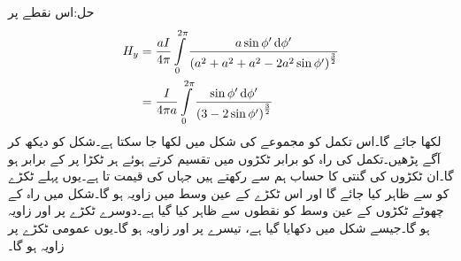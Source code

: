 حل:اس نقطے پر 
\begin{align*}
H_y&=\frac{aI}{4\pi}\int\limits_0^{2\pi} \frac{a\sin \phi' \dif \phi'}{\left(a^2+a^2+a^2-2 a^2\sin \phi'\right)^{\frac{3}{2}}}\\
&=\frac{I}{4\pi a}\int\limits_0^{2\pi} \frac{\sin \phi' \dif \phi'}{\left(3-2\sin \phi'\right)^{\frac{3}{2}}}
\end{align*}
لکھا جائے گا۔اس تکمل کو مجموعے کی شکل میں لکھا جا سکتا ہے۔شکل  کو دیکھ کر آگے پڑھیں۔تکمل کی راہ کو  برابر ٹکڑوں میں تقسیم کرتے  ہوئے ہر ٹکڑا پر  کے برابر ہو گا۔ان ٹکڑوں کی گنتی کا حساب ہم  سے رکھتے ہیں جہاں  کی قیمت  تا  ہے۔یوں پہلے ٹکڑے کو  سے ظاہر کیا جائے گا اور اس ٹکڑے کے عین وسط میں زاویہ  ہو گا۔شکل میں راہ کے چھوٹے ٹکڑوں کے عین وسط کو نقطوں سے ظاہر کیا گیا ہے۔دوسرے ٹکڑے پر  اور زاویہ  ہو گا۔جیسے شکل میں دکھایا گیا ہے، تیسرے پر  اور زاویہ   ہو گا۔یوں عمومی ٹکڑے  پر زاویہ
  ہو گا۔

